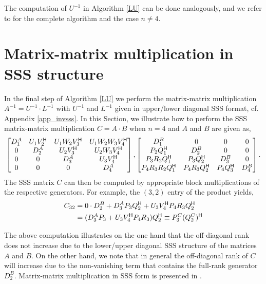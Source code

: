 The computation of $U^{-1}$ in Algorithm \ref{LU} can be done analogously, and we refer to \cite[Lemma 2]{sss_techrep03} for the complete algorithm and the case $n \neq 4$.
\section{Matrix-matrix multiplication in SSS structure}
\label{app_matmulsss}
In the final step of Algorithm \ref{LU} we perform the matrix-matrix multiplication  $A^{-1} = U^{-1} \cdot L^{-1}$ with $U^{-1}$ and $L^{-1}$ given in upper/lower diagonal SSS format, cf. Appendix \ref{app_invsss}. In this Section, we illustrate how to perform the SSS matrix-matrix multiplication $C = A \cdot B$ when $n=4$ and $A$ and $B$ are given as,
\begin{align*}
\begin{bmatrix}
    D_1^A & U_1V_2^{\mathsf{H}} & U_1W_2V_3^{\mathsf{H}} & U_1W_2W_3V_4^{\mathsf{H}} \\
    0 & D_2^A & U_2V_3^{\mathsf{H}} & U_2W_3V_4^{\mathsf{H}}  \\
    0 & 0 & D_3^A & U_3V_4^{\mathsf{H}}  \\
    0 & 0 & 0 & D_4^A
    \end{bmatrix},
\begin{bmatrix}
    D_1^B & 0 & 0 & 0 \\
    P_2Q_1^{\mathsf{H}} & D_2^B & 0 & 0  \\
    P_3R_2Q_1^{\mathsf{H}} & P_3Q_2^{\mathsf{H}} & D_3^B & 0  \\
    P_4R_3R_2Q_1^{\mathsf{H}} & P_4R_3Q_2^{\mathsf{H}} & P_4Q_3^{\mathsf{H}} & D_4^B
    \end{bmatrix}.
\end{align*}
The SSS matrix $C$ can then be computed by appropriate block multiplications of the respective generators. For example, the $(3,2)$ entry of the product yields,
\begin{align*}
C_{32} &= 0 \cdot D_2^B + D_3^A P_3 Q_2^{\mathsf{H}} + U_3 V_4^{\mathsf{H}} P_4 R_3 Q_2^{\mathsf{H}} \\
       &= (D_3^A P_3 + U_3 V_4^{\mathsf{H}} P_4 R_3) Q_2^{\mathsf{H}} \equiv P_3^C (Q_2^C)^{\mathsf{H}}
\end{align*}

The above computation illustrates on the one hand that the off-diagonal rank does not increase due to the lower/upper diagonal SSS structure of the matrices $A$ and $B$. On the other hand, we note that in general the off-diagonal rank of $C$ will increase due to the non-vanishing term that contains the full-rank generator $D_2^B$. Matrix-matrix multiplication in SSS form is presented in \cite[Theorem~1]{sss_techrep03}.